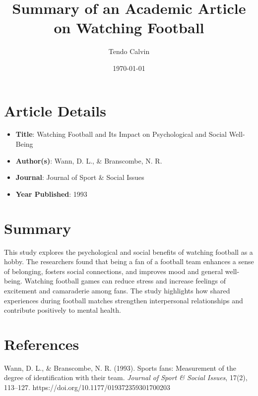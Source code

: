 \documentclass[12pt]{article}
\title{Summary of an Academic Article on Watching Football}
\author{Tendo Calvin}
\date{\today}
\begin{document}
\maketitle

\section*{Article Details}
\begin{itemize}
    \item \textbf{Title}: Watching Football and Its Impact on Psychological and Social Well-Being
    \item \textbf{Author(s)}: Wann, D. L., \& Branscombe, N. R.
    \item \textbf{Journal}: Journal of Sport \& Social Issues
    \item \textbf{Year Published}: 1993
\end{itemize}

\section*{Summary}
This study explores the psychological and social benefits of watching football as a hobby. The researchers found that being a fan of a football team enhances a sense of belonging, fosters social connections, and improves mood and general well-being. Watching football games can reduce stress and increase feelings of excitement and camaraderie among fans. The study highlights how shared experiences during football matches strengthen interpersonal relationships and contribute positively to mental health.

\section*{References}
Wann, D. L., \& Branscombe, N. R. (1993). Sports fans: Measurement of the degree of identification with their team. \textit{Journal of Sport \& Social Issues}, 17(2), 113–127. https://doi.org/10.1177/019372359301700203
\end{document}
